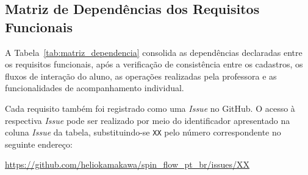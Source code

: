 \subsection{Matriz de Dependências dos Requisitos Funcionais}

A Tabela~\ref{tab:matriz_dependencia} consolida as dependências declaradas entre os requisitos funcionais, após a verificação de consistência entre os cadastros, os fluxos de interação do aluno, as operações realizadas pela professora e as funcionalidades de acompanhamento individual.

Cada requisito também foi registrado como uma \textit{Issue} no GitHub. O acesso à respectiva \textit{Issue} pode ser realizado por meio do identificador apresentado na coluna \textit{Issue} da tabela, substituindo-se \texttt{XX} pelo número correspondente no seguinte endereço:

\url{https://github.com/heliokamakawa/spin_flow_pt_br/issues/XX}

